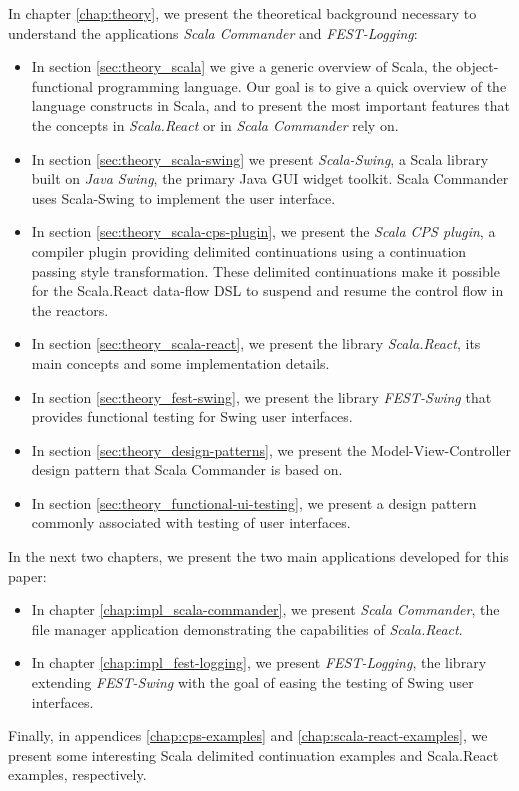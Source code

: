 In chapter \ref{chap:theory}, we present the theoretical background necessary to understand the applications \emph{Scala Commander} and \emph{FEST-Logging}:
\begin{itemize}
\item In section \ref{sec:theory_scala} we give a generic overview of Scala, the object-functional programming language. Our goal is to give a quick overview of the language constructs in Scala, and to present the most important features that the concepts in \emph{Scala.React} or in \emph{Scala Commander} rely on. %

\item In section \ref{sec:theory_scala-swing} we present \emph{Scala-Swing}\cite{ScalaSwing}, a Scala library built on \emph{Java Swing}, the primary Java GUI widget toolkit. \cite{Robinson:1999:SWI:554530} Scala Commander uses Scala-Swing to implement the user interface.

\item In section \ref{sec:theory_scala-cps-plugin}, we present the \emph{Scala CPS plugin}, a compiler plugin providing delimited continuations using a continuation passing style transformation. These delimited continuations make it possible for the Scala.React data-flow DSL to suspend and resume the control flow in the reactors.

\item In section \ref{sec:theory_scala-react}, we present the library \emph{Scala.React}, its main concepts and some implementation details.

\item In section \ref{sec:theory_fest-swing}, we present the library \emph{FEST-Swing} that provides functional testing for Swing user interfaces.

\item In section \ref{sec:theory_design-patterns}, we present the Model-View-Controller design pattern that Scala Commander is based on.

\item In section \ref{sec:theory_functional-ui-testing}, we present a design pattern commonly associated with testing of user interfaces.
\end{itemize}

In the next two chapters, we present the two main applications developed for this paper:
\begin{itemize}
\item In chapter \ref{chap:impl_scala-commander}, we present \emph{Scala Commander}, the file manager application demonstrating the capabilities of \emph{Scala.React}.
\item In chapter \ref{chap:impl_fest-logging}, we present \emph{FEST-Logging}, the library extending \emph{FEST-Swing} with the goal of easing the testing of Swing user interfaces.
\end{itemize}


Finally, in appendices \ref{chap:cps-examples} and \ref{chap:scala-react-examples}, we present some interesting Scala delimited continuation examples and Scala.React examples, respectively.



